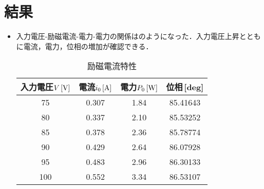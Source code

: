 \clearpage

\section{結果}
\begin{itemize}
	\item 入力電圧-励磁電流-電力-電力の関係はのようになった．入力電圧上昇とともに電流，電力，位相の増加が確認できる．
	\begin{table}[h]
	\centering
	\caption{励磁電流特性}
	\label{tab:re1}
	\begin{tabular}{cccc}
	\hline
	入力電圧$V\,[\rm{V}]$& 電流$i_{0}\,[\rm{A}]$& 電力$P_{0}\,[\rm{W}]$& 位相\,[\rm{deg}]  \\ 
	\hline
	75  & 0.307    & 1.84     & 85.41643 \\
	80  & 0.337    & 2.10      & 85.53252 \\
	85  & 0.378    & 2.36     & 85.78774 \\
	90  & 0.429    & 2.64     & 86.07928 \\
	95  & 0.483    & 2.96     & 86.30133 \\
	100 & 0.552    & 3.34     & 86.53107 \\ \hline
	\end{tabular}
	\end{table}
\end{itemize}